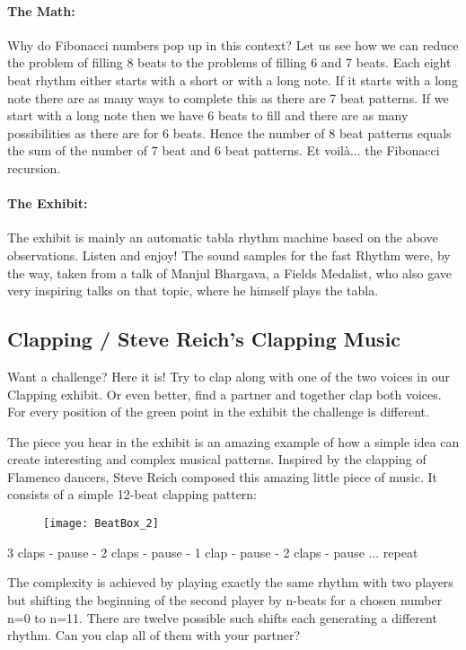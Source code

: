 \paragraph{The Math:}
Why do Fibonacci numbers pop up in this context? Let us see how we can reduce the problem of filling 8 beats to the problems of filling 6 and 7 beats. Each eight beat rhythm either starts with a short or with a long note. If it starts with a long note there are as many ways to complete this as there are 7 beat patterns. If we start with a long  note then we have 6 beats to fill and there are as many possibilities as there are for 6 beats. Hence the number of 8 beat patterns equals the sum of the number of 7 beat and 6 beat patterns. Et voilà... the Fibonacci recursion. 

\paragraph{The Exhibit:} The exhibit is mainly an automatic tabla rhythm machine based on the above observations. Listen and enjoy! The sound samples for the fast Rhythm were, by the way, taken from a talk of Manjul Bhargava, a Fields Medalist, who also gave very inspiring talks on that topic, where he himself plays the tabla. 

\subsection{Clapping / Steve Reich's Clapping Music}
Want a challenge? Here it is! Try to clap along with one of the two voices in our Clapping exhibit. Or even better, find a partner and together clap both voices. For every position of the green point in the exhibit the challenge is different.

The piece you hear in the exhibit is an amazing example of how a simple idea can create interesting and complex musical patterns. Inspired by the clapping of Flamenco dancers, Steve Reich composed this amazing little piece of music. It consists of a simple 12-beat clapping pattern: 

\begin{figure}[h]
\centering
\texttt{[image: BeatBox\_2]}
\end{figure}

3 claps - pause - 2 claps - pause - 1 clap - pause - 2 claps - pause ... repeat

The complexity is achieved by playing exactly the same rhythm with two players but shifting the beginning of the second player by n-beats for a chosen number n=0 to n=11. There are twelve possible such shifts each generating a different rhythm. Can you clap all of them with your partner?

